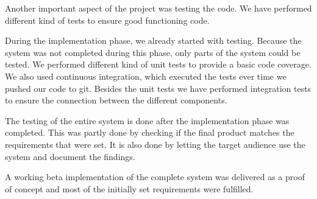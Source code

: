 Another important aspect of the project was testing the code.
We have performed different kind of tests to ensure good functioning code.

During the implementation phase, we already started with testing. 
Because the system was not completed during this phase, only parts of the system could be tested.
We performed different kind of unit tests to provide a basic code coverage.
We also used continuous integration, which executed the tests ever time we pushed our code to git.
Besides the unit tests we have performed integration tests to ensure the connection between the different components.

The testing of the entire system is done after the implementation phase was completed. 
This was partly done by checking if the final product matches the requirements that were set. 
It is also done by letting the target audience use the system and document the findings.

A working beta implementation of the complete system was delivered as a proof of concept and most of the initially set requirements were fulfilled.
